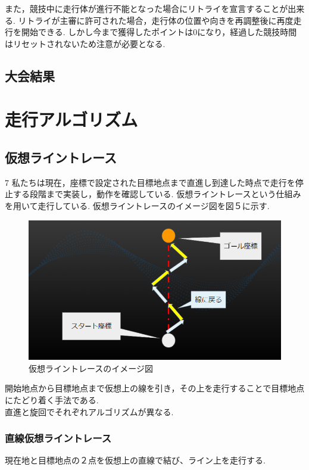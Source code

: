 \documentclass[submit,techrep,noauthor]{ipsj}
\begin{document}
また，競技中に走行体が進行不能となった場合にリトライを宣言することが出来る.
リトライが主審に許可された場合，走行体の位置や向きを再調整後に再度走行を開始できる.
しかし今まで獲得したポイントは0になり，経過した競技時間はリセットされないため注意が必要となる.

\subsection{大会結果}

\section{走行アルゴリズム}
\subsection{仮想ライントレース}7
私たちは現在，座標で設定された目標地点まで直進し到達した時点で走行を停止する段階まで実装し，動作を確認している.
仮想ライントレースという仕組みを用いて走行している.
仮想ライントレースのイメージ図を図５に示す.

\begin{figure}[h]
 \centering
   \includegraphics[scale=0.48]{vr_line.png}
 \caption{仮想ライントレースのイメージ図}
 \label{仮想ライントレースのイメージ図}
\end{figure}

開始地点から目標地点まで仮想上の線を引き，その上を走行することで目標地点にたどり着く手法である.\\
直進と旋回でそれぞれアルゴリズムが異なる.\\

\subsubsection{直線仮想ライントレース}
現在地と目標地点の２点を仮想上の直線で結び、ライン上を走行する.\\
\end{document}
